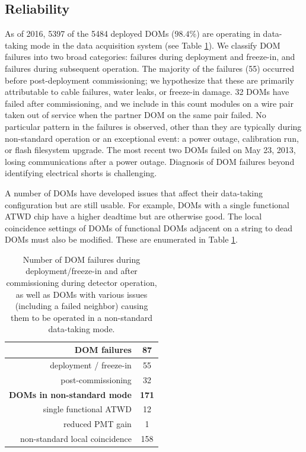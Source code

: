 \subsection{\label{sec:reliability}Reliability}

As of 2016, 5397 of the 5484 deployed DOMs ($98.4\%$) are operating in
data-taking mode in the data acquisition system (see Table
\ref{tab:dom_failures}).  We classify DOM 
failures into two broad categories: failures during deployment and
freeze-in, and failures during subsequent operation.  The majority of the
failures (55) occurred before post-deployment commissioning; we hypothesize
that these are primarily attributable to cable failures, water leaks,
or freeze-in damage. 32 DOMs have failed after commissioning, and
we include in this count modules on a wire pair taken out of service when
the partner DOM on the same pair failed.  No particular pattern in the
failures is observed, other than they are typically during non-standard
operation or an exceptional event: a power outage, calibration run, or
flash filesystem upgrade.  The most recent two DOMs failed on May 23, 2013,
losing communications after a power outage.  Diagnosis of DOM failures
beyond identifying electrical shorts is challenging.

A number of DOMs have developed issues that affect their data-taking
configuration but are still usable.  For example, DOMs with a single functional
ATWD chip have a higher deadtime but are otherwise good.  The local
coincidence settings of DOMs of functional DOMs adjacent on a string to
dead DOMs must also be modified. These are enumerated in Table \ref{tab:dom_failures}.  

\begin{table}[h]
  \centering
  \caption{Number of DOM failures during deployment/freeze-in and after
    commissioning during detector operation, as well as DOMs with various
    issues (including a failed neighbor) causing them to be operated in a
    non-standard data-taking mode.} 
  \label{tab:dom_failures}
  \begin{tabular}{| r | c |}
    \hline
    \bf{DOM failures} & \bf{87} \\
    \hline    
    deployment / freeze-in & 55 \\
    post-commissioning & 32 \\
    \hline
    \hline
    \bf{DOMs in non-standard mode} & \bf{171} \\
    \hline
    single functional ATWD & 12 \\
    reduced PMT gain & 1 \\
    non-standard local coincidence & 158 \\
    \hline    
  \end{tabular}
\end{table}

